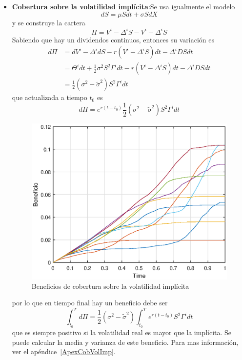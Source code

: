 \begin{itemize}
    \item \textbf{Cobertura sobre la volatilidad implícita}:Se usa igualmente el modelo
    \[
        dS = \mu S dt + \sigma S dX
    \]
    y se construye la cartera
    \[
        \Pi = V^i-\Delta^i S-V^i + \Delta^i S
    \]
    Sabiendo que hay un dividendos continuos, entonces su variación es
    \begin{align*}
        d\Pi &= dV^i - \Delta^i dS - r(V^i - \Delta^i S)dt - \Delta^i D S dt \\
        &= \Theta^i dt + \frac{1}{2} \sigma^2 S^2 \Gamma^i dt - r(V^i - \Delta^i S)dt - \Delta^i D S dt \\
        &= \frac{1}{2}(\sigma^2 - \tilde{\sigma}^2)S^2 \Gamma^i dt
    \end{align*}
    que actualizada a tiempo $t_0$ es
    \[ 
        d\Pi = e^{r(t-t_0)}\frac{1}{2}(\sigma^2 - \tilde{\sigma}^2)S^2 \Gamma^i dt
    \]
    \begin{figure}[H]
        \centering
        \includegraphics[width=0.65\linewidth]{Imagenes/10_Cobertura/Cobertura_Volat_Imp.eps}
        \caption{Beneficios de cobertura sobre la volatilidad implícita}
    \end{figure}
    por lo que en tiempo final hay un beneficio debe ser
    \[
        \boxed{\int_{t_0}^T d\Pi = \frac{1}{2}(\sigma^2 - \tilde{\sigma}^2) \int_{t_0}^T e^{r(t-t_0)}S^2 \Gamma^i dt}
    \]
    que es siempre positivo si la volatilidad real es mayor que la implícita. Se puede calcular la media y varianza de este beneficio. Para mas información, ver el apéndice~\ref{ApexCobVolImp}.


\end{itemize}
